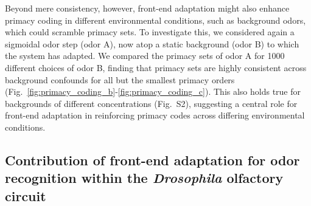 \documentclass[9pt,twocolumn,twoside]{pnas-new}
\begin{document}
Beyond mere consistency, however, front-end adaptation might also enhance primacy coding in different environmental conditions, such as background odors, which could scramble primacy sets. To investigate this, we considered again a sigmoidal odor step (odor A), now atop a static background (odor B) to which the system has adapted. We compared the primacy sets of odor A for 1000 different choices of odor B, finding that primacy sets are highly consistent across background confounds for all but the smallest primacy orders (Fig.~\ref{fig:primacy_coding_b}-\ref{fig:primacy_coding_c}). This also holds true for backgrounds of different concentrations (Fig.~S2), suggesting a central role for front-end adaptation in reinforcing primacy codes across differing environmental conditions. 


\subsection*{Contribution of front-end adaptation for odor recognition within the \textit{Drosophila} olfactory circuit}
\end{document}
